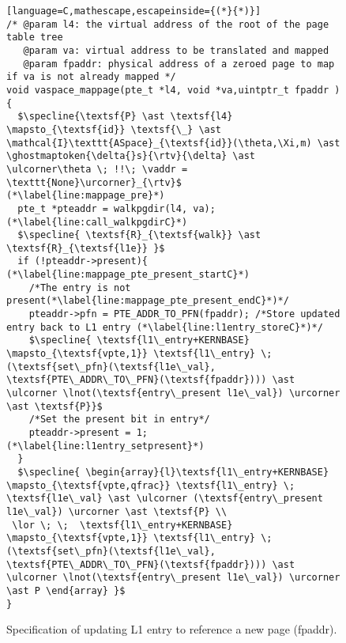 \begin{figure}\footnotesize
  \begin{lstlisting}[language=C,mathescape,escapeinside={(*}{*)}]
/* @param l4: the virtual address of the root of the page table tree
   @param va: virtual address to be translated and mapped
   @param fpaddr: physical address of a zeroed page to map if va is not already mapped */
void vaspace_mappage(pte_t *l4, void *va,uintptr_t fpaddr ) {
  $\specline{\textsf{P} \ast \textsf{l4} \mapsto_{\textsf{id}} \textsf{\_} \ast \mathcal{I}\texttt{ASpace}_{\textsf{id}}(\theta,\Xi,m) \ast \ghostmaptoken{\delta{}s}{\rtv}{\delta} \ast \ulcorner\theta \; !!\; \vaddr = \texttt{None}\urcorner}_{\rtv}$ (*\label{line:mappage_pre}*)
  pte_t *pteaddr = walkpgdir(l4, va); (*\label{line:call_walkpgdirC}*)
  $\specline{ \textsf{R}_{\textsf{walk}} \ast \textsf{R}_{\textsf{l1e}} }$
  if (!pteaddr->present){ (*\label{line:mappage_pte_present_startC}*)
    /*The entry is not present(*\label{line:mappage_pte_present_endC}*)*/
    pteaddr->pfn = PTE_ADDR_TO_PFN(fpaddr); /*Store updated entry back to L1 entry (*\label{line:l1entry_storeC}*)*/
    $\specline{ \textsf{l1\_entry+KERNBASE} \mapsto_{\textsf{vpte,1}} \textsf{l1\_entry} \; (\textsf{set\_pfn}(\textsf{l1e\_val}, \textsf{PTE\_ADDR\_TO\_PFN}(\textsf{fpaddr}))) \ast  \ulcorner \lnot(\textsf{entry\_present l1e\_val}) \urcorner \ast \textsf{P}}$
    /*Set the present bit in entry*/
    pteaddr->present = 1;(*\label{line:l1entry_setpresent}*)
  }
  $\specline{ \begin{array}{l}\textsf{l1\_entry+KERNBASE} \mapsto_{\textsf{vpte,qfrac}} \textsf{l1\_entry} \; \textsf{l1e\_val} \ast \ulcorner (\textsf{entry\_present l1e\_val}) \urcorner \ast \textsf{P} \\
 \lor \; \;  \textsf{l1\_entry+KERNBASE} \mapsto_{\textsf{vpte,1}} \textsf{l1\_entry} \; (\textsf{set\_pfn}(\textsf{l1e\_val}, \textsf{PTE\_ADDR\_TO\_PFN}(\textsf{fpaddr}))) \ast  \ulcorner \lnot(\textsf{entry\_present l1e\_val}) \urcorner \ast P \end{array} }$
}
\end{lstlisting}
\vspace{-1em}
  \caption{Specification of updating L1 entry to reference a new page (\textsf{fpaddr}).}
\label{fig:mapping_codeC}
\end{figure}


